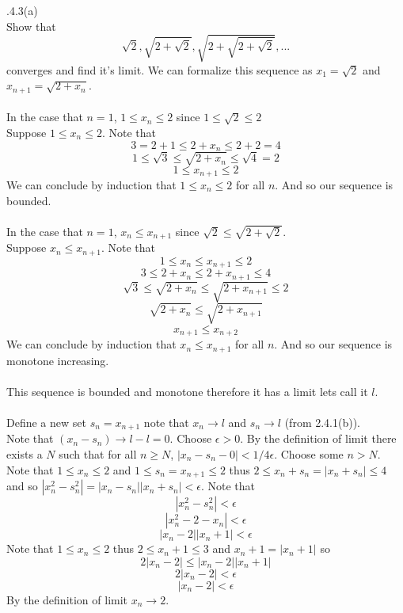 \documentclass[12pt]{article}
\makeatletter
\theoremstyle{homework}
\newenvironment{exercise}[1]
{\def\@currentlabel{#1}\exercisecore}
{\endexercisecore}
\makeatother
\begin{document}
\begin{exercise}

2.4.3(a)\\
Show that 
$$\sqrt{2},\sqrt{2+\sqrt{2}},\sqrt{2+\sqrt{2+\sqrt{2}}},...$$
converges and find it's limit.
\end{exercise}
We can formalize this sequence as $x_1=\sqrt{2}$ and $x_{n+1}=\sqrt{2+x_n}$.\\\\
In the case that $n=1$, $1\leq x_n\leq 2$ since $1\leq \sqrt{2}\leq 2$\\
Suppose $1\leq x_n\leq 2$.  Note that
$$3=2+1\leq 2+x_n\leq 2+2=4$$
$$1\leq \sqrt{3}\leq \sqrt{2+x_n}\leq \sqrt{4}=2$$
$$1\leq x_{n+1}\leq 2$$
We can conclude by induction that $1\leq x_n\leq 2$ for all $n$.  And so our sequence is bounded.\\\\
In the case that $n=1$, $x_{n}\leq x_{n+1}$ since $\sqrt{2}\leq \sqrt{2+\sqrt{2}}$.\\
Suppose $x_{n}\leq x_{n+1}$.  Note that
$$1\leq x_{n}\leq x_{n+1}\leq 2$$
$$3\leq 2+x_{n}\leq 2+x_{n+1}\leq 4$$
$$\sqrt{3}\leq \sqrt{2+x_{n}}\leq \sqrt{2+x_{n+1}}\leq 2$$
$$\sqrt{2+x_{n}}\leq \sqrt{2+x_{n+1}}$$
$$x_{n+1}\leq x_{n+2}$$
We can conclude by induction that $x_{n}\leq x_{n+1}$ for all $n$.  And so our sequence is monotone increasing.\\\\
This sequence is bounded and monotone therefore it has a limit lets call it $l$.\\\\
Define a new set $s_n = x_{n+1}$ note that $x_n\rightarrow l$ and $s_n\rightarrow l$ (from 2.4.1(b)).\\
Note that $(x_n-s_n)\rightarrow l-l=0$.  Choose $\epsilon>0$.  By the definition of limit there exists a $N$ such that for all $n\geq N$, $|x_n-s_n-0|<1/4\epsilon$.  Choose some $n>N$.  Note that $1\leq x_n\leq 2$ and $1\leq s_n=x_{n+1}\leq 2$ thus $2\leq x_n+s_n=|x_n+s_n|\leq 4$ and so $|x_n^2-s_n^2|=|x_n-s_n||x_n+s_n|<\epsilon$.  Note that
$$|x_n^2-s_n^2|<\epsilon$$
$$|x_n^2-2-x_n|<\epsilon$$
$$|x_n-2||x_n+1|<\epsilon$$
Note that $1\leq x_n\leq 2$ thus $2\leq x_n+1\leq 3$ and $x_n+1=|x_n+1|$ so
$$2|x_n-2|\leq|x_n-2||x_n+1|$$
$$2|x_n-2|<\epsilon$$
$$|x_n-2|<\epsilon$$
By the definition of limit $x_n\rightarrow 2$.
\end{document}
